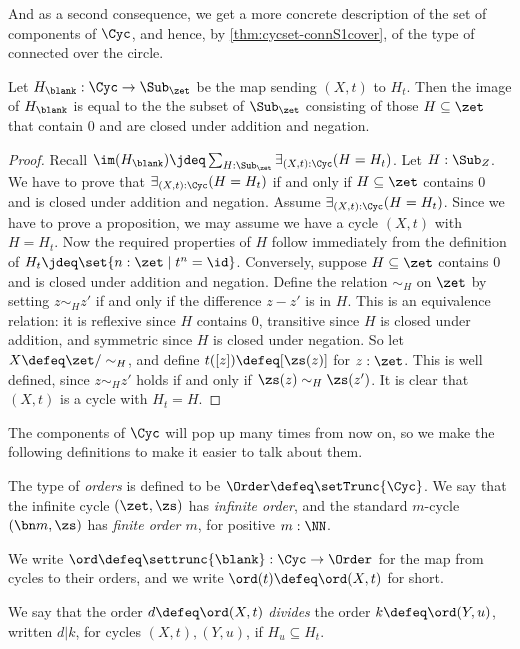 And as a second consequence,
we get a more concrete description of the set of components of $\Cyc$,
and hence, by \cref{thm:cycset-connS1cover},
of the type of connected \coverings over the circle.
\begin{corollary}\label{cor:set-trunc-cyc}
  Let $H_\blank : \Cyc \to \Sub_\zet$ be the map sending $(X,t)$ to $H_t$.
  Then the image of $H_\blank$ is equal to the 
  the subset of $\Sub_\zet$ consisting of those
  $H\subseteq\zet$ that contain $0$ and are closed under addition and negation.
\end{corollary}
\begin{proof}
Recall $\im(H_\blank)\jdeq\sum_{H:\Sub_\zet}\exists_{(X,t):\Cyc}(H=H_t)$.
Let $H:\Sub_Z$.
We have to prove that $\exists_{(X,t):\Cyc}(H=H_t)$
if and only if $H\subseteq\zet$ contains $0$ and is closed under addition 
and negation. 
Assume $\exists_{(X,t):\Cyc}(H=H_t)$.
Since we have to prove a proposition, we may assume we have a cycle $(X,t)$ with
$H=H_t$. Now the required properties of $H$ follow immediately from
the definition of $H_t\jdeq\set{n:\zet \mid t^n = \id}$.
Conversely, suppose $H \subseteq \zet$ contains $0$ and 
  is closed under addition and negation.
  Define the relation $\sim_H$ on $\zet$ by setting $z \sim_H z'$ if and only if
  the difference $z-z'$ is in $H$.
  This is an equivalence relation:
  it is reflexive since $H$ contains $0$,
  transitive since $H$ is closed under addition,
  and symmetric since $H$ is closed under negation.
  So let $X \defeq \zet/\sim_H$, and define $t([z])\defeq[\zs(z)]$
  for $z:\zet$.
  This is well defined, since $z \sim_H z'$ holds if and only if
  $\zs(z) \sim_H \zs(z')$.
  It is clear that $(X,t)$ is a cycle with $H_t = H$.
\end{proof}
The components of $\Cyc$ will pop up many times from now on,
so we make the following definitions to make it easier to talk about them.
\begin{definition}\label{def:Order}
  The type of \emph{orders} is defined to be
  $\Order\defeq\setTrunc{\Cyc}$.
  We say that the infinite cycle $(\zet,\zs)$ has \emph{infinite order},
  and the standard $m$-cycle $(\bn m,\zs)$ has \emph{finite order $m$},
  for positive $m:\NN$.

  We write $\ord\defeq\settrunc{\blank}:\Cyc\to\Order$ for the map
  from cycles to their orders, and we write $\ord(t)\defeq\ord(X,t)$ for short.

  We say that the order $d\defeq\ord(X,t)$ \emph{divides} the order $k\defeq\ord(Y,u)$, written $d | k$,
  for cycles $(X,t),(Y,u)$, if $H_u \subseteq H_t$.
\end{definition}
